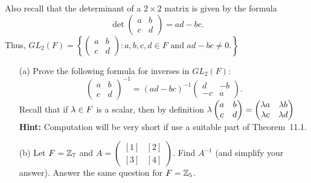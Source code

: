 \documentclass[11pt]{amsart}
\begin{document}
Also recall that the determinant of a $2\times 2$  matrix is given by the formula 
$$\det
\begin{pmatrix}a&b\\ c&d
\end{pmatrix}=ad-bc.$$
Thus, $GL_2(F)=\left\{\begin{pmatrix}a&b\\ c&d
\end{pmatrix}: a,b,c,d\in F \mbox{ and }ad-bc\neq 0.\right\}$
\begin{itemize}
\item[(a)] Prove the following formula for inverses in $GL_2(F)$:
$${\begin{pmatrix}a&b\\ c&d
\end{pmatrix}}^{-1}=(ad-bc)^{-1}\begin{pmatrix}d&-b\\ -c&a
\end{pmatrix}.$$
Recall that if ${\lambda}\in F$ is a scalar, then by definition 
${\lambda} \begin{pmatrix}a&b\\ c&d \end{pmatrix}=\begin{pmatrix}{\lambda} a&{\lambda} b\\ {\lambda} c&{\lambda} d \end{pmatrix}$
{\bf Hint:} Computation will be very short if use a suitable part of Theorem~11.1.
\item[(b)] Let $F={\mathbb Z}_7$ and $A=\begin{pmatrix}[1]&[2]\\ [3]&[4]\end{pmatrix}$. Find $A^{-1}$ (and simplify your answer).  Answer the same question for $F={\mathbb Z}_5$.
\end{itemize}
\end{document}
